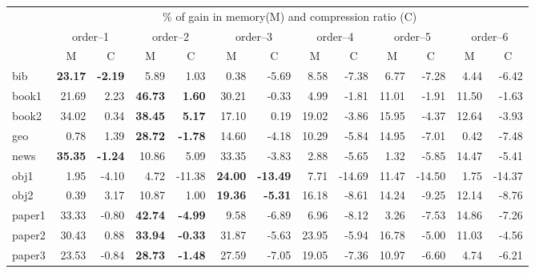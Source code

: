 \documentclass[runningheads,a4paper]{llncs}
\begin{document}
\renewcommand{\arraystretch}{1.3}
\begin{table}
\small{
\begin{tabular}{l|rr|rr|rr|rr|rr|rr|}
\multicolumn{1}{c}{} & \multicolumn{12}{c}{\% of gain in memory(M) and compression ratio (C)} \\
\multicolumn{1}{c}{} & \multicolumn{2}{c}{order--1} & \multicolumn{2}{c}{order--2} & \multicolumn{2}{c}{order--3} &
               \multicolumn{2}{c}{order--4} & \multicolumn{2}{c}{order--5} & \multicolumn{2}{c}{order--6} \\ 
\multicolumn{1}{c}{} & \multicolumn{1}{c}{M} & \multicolumn{1}{c}{C} &
\multicolumn{1}{c}{M} & \multicolumn{1}{c}{C} & \multicolumn{1}{c}{M} & \multicolumn{1}{c}{C} & \multicolumn{1}{c}{M} &
\multicolumn{1}{c}{C} & \multicolumn{1}{c}{M} & \multicolumn{1}{c}{C} & \multicolumn{1}{c}{M} & \multicolumn{1}{c}{C}\\
\hline
bib & \textbf{23.17} & \textbf{-2.19} & 5.89 & 1.03 & 0.38 & -5.69 & 8.58 & -7.38 & 6.77 & -7.28 & 4.44 & -6.42 \\
\hline
book1 & 21.69 & 2.23 & \textbf{46.73} & \textbf{1.60} & 30.21 & -0.33 & 4.99 & -1.81 & 11.01 & -1.91 & 11.50 & -1.63 \\
\hline
book2 & 34.02 & 0.34 & \textbf{38.45} & \textbf{5.17} & 17.10 & 0.19 & 19.02 & -3.86 & 15.95 & -4.37 & 12.64 & -3.93 \\
\hline
geo & 0.78 & 1.39 & \textbf{28.72} & \textbf{-1.78} & 14.60 & -4.18 & 10.29 & -5.84 & 14.95 & -7.01 & 0.42 & -7.48 \\
\hline
news & \textbf{35.35} & \textbf{-1.24} & 10.86 & 5.09 & 33.35 & -3.83 & 2.88 & -5.65 & 1.32 & -5.85 & 14.47 & -5.41 \\
\hline
obj1 & 1.95 & -4.10 & 4.72 & -11.38 & \textbf{24.00} & \textbf{-13.49} & 7.71 & -14.69 & 11.47 & -14.50 & 1.75 & -14.37
\\ \hline
obj2 & 0.39 & 3.17 & 10.87 & 1.00 & \textbf{19.36} & \textbf{-5.31} & 16.18 & -8.61 & 14.24 & -9.25 & 12.14 & -8.76 \\
\hline
paper1 & 33.33 & -0.80 & \textbf{42.74} & \textbf{-4.99} & 9.58 & -6.89 & 6.96 & -8.12 & 3.26 & -7.53 & 14.86 & -7.26 \\
\hline
paper2 & 30.43 & 0.88 & \textbf{33.94} & \textbf{-0.33} & 31.87 & -5.63 & 23.95 & -5.94 & 16.78 & -5.00 & 11.03 & -4.56
\\ \hline
paper3 & 23.53 & -0.84 & \textbf{28.73} & \textbf{-1.48} & 27.59 & -7.05 & 19.05 & -7.36 & 10.97 & -6.60 & 4.74 & -6.21
\\ \hline

\end{tabular}}
\end{table}
\end{document}
